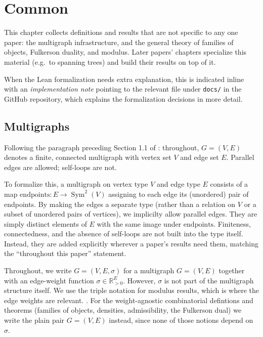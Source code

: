 \chapter{Common}
\label{chap:common}

This chapter collects definitions and results that are not specific to any one
paper: the multigraph infrastructure, and the general theory of families of
objects, Fulkerson duality, and modulus. Later papers' chapters specialize
this material (e.g.\ to spanning trees) and build their results on top of it.

When the Lean formalization needs extra explanation, this is indicated inline
with an \emph{implementation note} pointing to the relevant file under
\texttt{docs/} in the GitHub repository, which explains the formalization
decisions in more detail.

\section{Multigraphs}

\begin{definition}[Multigraph]
\label{def:multigraph}
\leanok
Following the paragraph preceding Section 1.1 of \feupaperref{}: throughout, $G
= (V, E)$ denotes a finite, connected multigraph with vertex set $V$ and edge
set $E$. Parallel edges are allowed; self-loops are not.

To formalize this, a multigraph on vertex type $V$ and edge type $E$ consists of
a map $\mathrm{endpoints} \colon E \to \operatorname{Sym}^2(V)$ assigning to
each edge its (unordered) pair of endpoints. By making the edges a separate type
(rather than a relation on $V$ or a subset of unordered pairs of vertices), we
implicilty allow parallel edges. They are  simply distinct elements of $E$ with
the same image under $\mathrm{endpoints}$. Finiteness, connectedness, and the
absence of self-loops are not built into the type itself. Instead, they are
added explicitly wherever a paper's results need them, matching the
``throughout this paper'' statement.

Throughout, we write $G = (V, E, \sigma)$ for a multigraph $G = (V, E)$ together
with an edge-weight function $\sigma \in \mathbb R_{>0}^E$. However, $\sigma$ is
not part of the multigraph structure itself. We use the triple notation for
modulus results, which is where the edge weights are relevant. . For the
weight-agnostic combinatorial defintions and theorems (families of objects,
densities, admissibility, the Fulkerson dual) we write the plain pair $G = (V,
E)$ instead, since none of those notions depend on $\sigma$.
\end{definition}

